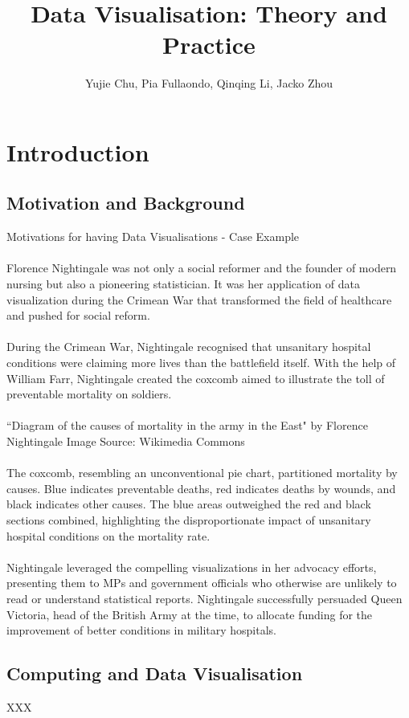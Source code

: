 \documentclass{article}\usepackage[]{graphicx}\usepackage[]{xcolor}
\title{Data Visualisation: Theory and Practice}
\author{Yujie Chu, Pia Fullaondo, Qinqing Li, Jacko Zhou}
\begin{document}
\maketitle 
\tableofcontents
\newpage 

\section{Introduction}

\subsection{Motivation and Background}
Motivations for having Data Visualisations - Case Example
\\  
\\Florence Nightingale was not only a social reformer and the founder of modern nursing but also a pioneering statistician. It was her application of data visualization during the Crimean War that transformed the field of healthcare and pushed for social reform.
\\  
\\During the Crimean War, Nightingale recognised that unsanitary hospital conditions were claiming more lives than the battlefield itself. With the help of William Farr, Nightingale created the coxcomb aimed to illustrate the toll of preventable mortality on soldiers.
\\  
\\``Diagram of the causes of mortality in the army in the East" by Florence Nightingale 
Image Source: Wikimedia Commons
\\  
\\The coxcomb, resembling an unconventional pie chart, partitioned mortality by causes. Blue indicates preventable deaths, red indicates deaths by wounds, and black indicates other causes.
The blue areas outweighed the red and black sections combined, highlighting the disproportionate impact of unsanitary hospital conditions on the mortality rate.
\\  
\\Nightingale leveraged the compelling visualizations in her advocacy efforts, presenting them to MPs and government officials who otherwise are unlikely to read or understand statistical reports. Nightingale successfully persuaded Queen Victoria, head of the British Army at the time, to allocate funding for the improvement of better conditions in military hospitals.

\subsection{Computing and Data Visualisation}
XXX
\end{document}
